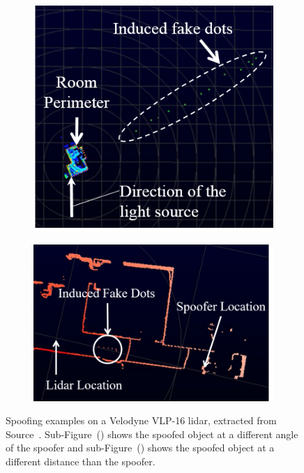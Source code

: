 \begin{figure}[!ht]
	\centering
	\begin{subfigure}[c]{0.4\textwidth}
	\includegraphics[width=\textwidth]{img/lidar/interference_angle_control.png}
\caption{}%
		\label{fig:shinInterferenceAngle}
	\end{subfigure}
	\quad
	\begin{subfigure}[c]{0.55\textwidth}
		\includegraphics[width=\textwidth]{img/lidar/interference_distance_control.png}
	\caption{}%
		\label{fig:shinInterferenceDistance}
	\end{subfigure}
	\caption[Spoofing obstacles on \acs{lidar} at different angles and closer distances that the spoofer.]{Spoofing examples on a Velodyne VLP-16 \ac{lidar}, extracted from Source~\cite{Shin2017}. Sub-Figure~() shows the spoofed object at a different angle of the spoofer and sub-Figure~() shows the spoofed object at a different distance than the spoofer.}
	\label{fig:shinInterference}
\end{figure}


